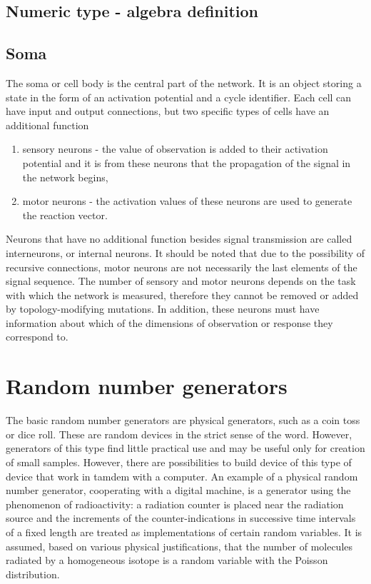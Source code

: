 \FloatBarrier
\subsection{Numeric type - algebra definition}



\FloatBarrier
\subsection{Soma}
The soma or cell body is the central part of the network. 
It is an object storing a state in the form of an activation potential and a cycle identifier. 
Each cell can have input and output connections, but two specific types of cells have an additional 
function
\begin{enumerate}
	\item sensory neurons - the value of observation is added to their activation potential and 
	it is from these neurons that the propagation of the signal in the network begins, 
	\item motor neurons - the activation values of these neurons are used to generate the 
	reaction vector.
\end{enumerate}
Neurons that have no additional function besides signal transmission are called interneurons, 
or internal neurons. 
It should be noted that due to the possibility of recursive connections, motor neurons are not 
necessarily the last elements of the signal sequence. 
The number of sensory and motor neurons depends on the task with which the network is measured, 
therefore they cannot be removed or added by topology-modifying mutations. 
In addition, these neurons must have information about which of the dimensions of observation or 
response they correspond to.

\FloatBarrier
\section{Random number generators}
The basic random number generators are physical generators, such as a coin toss or dice roll.
These are random devices in the strict sense of the word. 
However, generators of this type find little practical use and may be useful only for 
creation of small samples.
However, there are possibilities to build device of this type of device that work in tamdem with a computer.
An example of a physical random number generator, cooperating with a digital machine, is a generator using 
the phenomenon of radioactivity: a radiation counter is placed near the radiation source and the 
increments of the counter-indications in successive time intervals of a fixed length are treated as
implementations of certain random variables.
It is assumed, based on various physical justifications, that the number of molecules radiated by
a homogeneous isotope is a random variable with the Poisson distribution.

